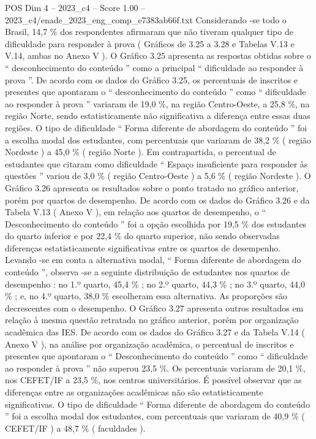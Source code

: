 \begin{textsample}{POS Dim 4 – 2023\_c4 – Score 1.00 – 2023\_c4/enade\_2023\_eng\_comp\_e7383ab66f.txt}
Considerando -se todo o Brasil, 14,7 \% dos respondentes afirmaram que não tiveram qualquer tipo de dificuldade para responder à prova ( Gráficos de 3.25 a 3.28 e Tabelas V.13 e V.14, ambas no Anexo V ).
O Gráfico 3.25 apresenta as respostas obtidas sobre o “ desconhecimento do conteúdo ” como a principal “ dificuldade ao responder à prova ”.
De acordo com os dados do Gráfico 3.25, os percentuais de inscritos e presentes que apontaram o “ desconhecimento do conteúdo ” como “ dificuldade ao responder à prova ” variaram de 19,0 \%, na região Centro-Oeste, a 25,8 \%, na região Norte, sendo estatisticamente não significativa a diferença entre essas duas regiões.
O tipo de dificuldade “ Forma diferente de abordagem do conteúdo ” foi a escolha modal dos estudantes, com percentuais que variaram de 38,2 \% ( região Nordeste ) a 45,0 \% ( região Norte ).
Em contrapartida, o percentual de estudantes que citaram como dificuldade “ Espaço insuficiente para responder às questões ” variou de 3,0 \% ( região Centro-Oeste ) a 5,6 \% ( região Nordeste ).
O Gráfico 3.26 apresenta os resultados sobre o ponto tratado no gráfico anterior, porém por quartos de desempenho.
De acordo com os dados do Gráfico 3.26 e da Tabela V.13 ( Anexo V ), em relação aos quartos de desempenho, o “ Desconhecimento do conteúdo ” foi a opção escolhida por 19,5 \% dos estudantes do quarto inferior e por 22,4 \% do quarto superior, não sendo observadas diferenças estatisticamente significativas entre os quartos de desempenho.
Levando -se em conta a alternativa modal, “ Forma diferente de abordagem do conteúdo ”, observa -se a seguinte distribuição de estudantes nos quartos de desempenho : no 1.º quarto, 45,4 \% ; no 2.º quarto, 44,3 \% ; no 3.º quarto, 44,0 \% ; e, no 4.º quarto, 38,0 \% escolheram essa alternativa.
As proporções são decrescentes com o desempenho.
O Gráfico 3.27 apresenta outros resultados em relação à mesma questão retratada no gráfico anterior, porém por organização acadêmica das IES.
De acordo com os dados do Gráfico 3.27 e da Tabela V.14 ( Anexo V ), na análise por organização acadêmica, o percentual de inscritos e presentes que apontaram o “ Desconhecimento do conteúdo ” como “ dificuldade ao responder à prova ” não superou 23,5 \%.
Os percentuais variaram de 20,1 \%, nos CEFET/IF a 23,5 \%, nos centros universitários.
É possível observar que as diferenças entre as organizações acadêmicas não são estatisticamente significativas.
O tipo de dificuldade “ Forma diferente de abordagem do conteúdo ” foi a escolha modal dos estudantes, com percentuais que variaram de 40,9 \% ( CEFET/IF ) a 48,7 \% ( faculdades ).

\end{textsample}
